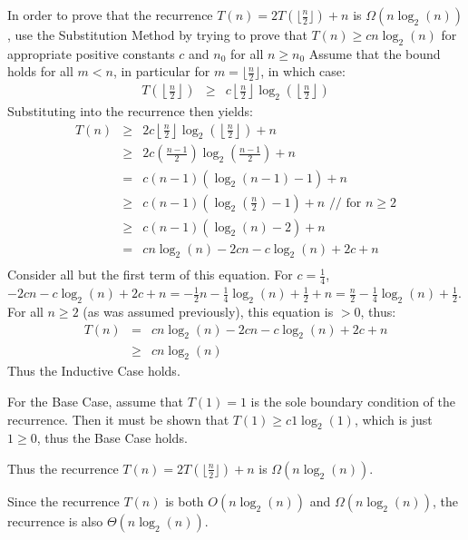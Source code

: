 In order to prove that the recurrence $T(n) = 2T(\lfloor \frac{n}{2} \rfloor) + n$ is $\Omega (n \log_2(n))$, use the Substitution Method by trying to prove that $T(n) \geq cn\log_2(n)$ for appropriate positive constants $c$ and $n_0$ for all $n \geq n_0$
Assume that the bound holds for all $m < n$, in particular for $m = \lfloor \frac{n}{2} \rfloor$, in which case:
\begin{eqnarray*}
	T\left(\left\lfloor \frac{n}{2} \right\rfloor\right) &\geq& c \left\lfloor \frac{n}{2} \right\rfloor \log_2\left(\left\lfloor \frac{n}{2} \right\rfloor\right)
\end{eqnarray*}
Substituting into the recurrence then yields:
\begin{eqnarray*}
	T(n) &\geq& 2c\left\lfloor \frac{n}{2} \right\rfloor \log_2\left(\left\lfloor \frac{n}{2} \right\rfloor\right) + n \\
	 &\geq& 2c \left( \frac{n - 1}{2} \right) \log_2 \left( \frac{n - 1}{2} \right) + n \\
	 &=& c (n - 1) (\log_2(n - 1) - 1) + n \\
	 &\geq& c (n - 1) \left(\log_2\left( \frac{n}{2}\right) - 1\right) + n \text{  // for $n \geq 2$} \\
	 &\geq& c (n - 1) (\log_2(n) - 2) + n \\
	 &=& cn \log_2(n) - 2cn - c\log_2(n) + 2c + n \\
\end{eqnarray*}
Consider all but the first term of this equation.  For $c = \frac{1}{4}$, $-2cn - c\log_2(n) + 2c + n = -\frac{1}{2}n - \frac{1}{4}\log_2(n) + \frac{1}{2} + n = \frac{n}{2} - \frac{1}{4} \log_2(n) + \frac{1}{2}$.  For all $n \geq 2$ (as was assumed previously), this equation is $> 0$, thus:
\begin{eqnarray*}
	T(n) &=& cn \log_2(n) - 2cn - c\log_2(n) + 2c + n \\
	 &\geq& cn \log_2(n)
\end{eqnarray*}
Thus the Inductive Case holds.

For the Base Case, assume that $T(1) = 1$ is the sole boundary condition of the recurrence.  Then it must be shown that $T(1) \geq c 1 \log_2(1)$, which is just $1 \geq 0$, thus the Base Case holds.

Thus the recurrence $T(n) = 2T(\lfloor \frac{n}{2} \rfloor) + n$ is $\Omega (n \log_2(n))$.

Since the recurrence $T(n)$ is both $O(n \log_2(n))$ and $\Omega(n \log_2(n))$, the recurrence is also $\Theta(n \log_2(n))$.
